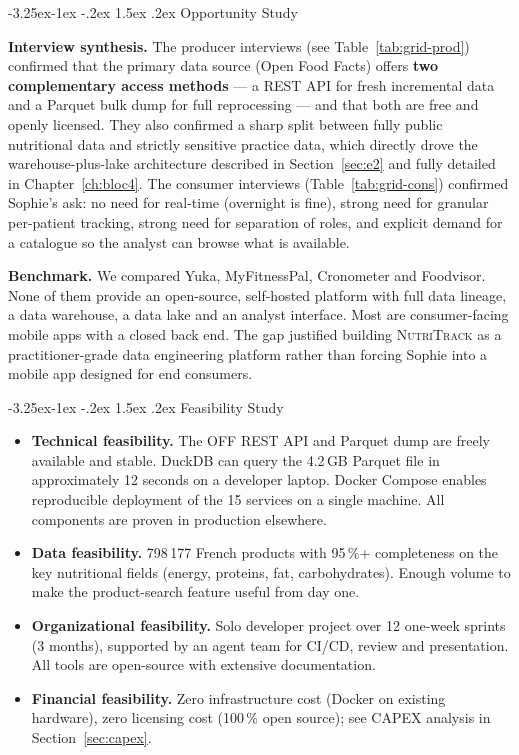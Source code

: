 \documentclass[a4paper,11pt,oneside,openany]{report}
\makeatletter
\renewcommand\subsubsection{\@startsection{subsubsection}{3}{\z@}%
  {-3.25ex\@plus -1ex \@minus -.2ex}%
  {1.5ex \@plus .2ex}%
  {\normalfont\normalsize\bfseries\color{ntblue}}}
\newcommand{\nutritrack}{\textsc{NutriTrack}}
\newcommand{\off}{Open Food Facts}
\makeatother
\begin{document}
\subsubsection{Opportunity Study}

\textbf{Interview synthesis.} The producer interviews (see
Table~\ref{tab:grid-prod}) confirmed that the primary data source
(\off{}) offers \textbf{two complementary access methods} --- a REST
API for fresh incremental data and a Parquet bulk dump for full
reprocessing --- and that both are free and openly licensed. They
also confirmed a sharp split between fully public nutritional data
and strictly sensitive practice data, which directly drove the
warehouse-plus-lake architecture described in
Section~\ref{sec:e2} and fully detailed in Chapter~\ref{ch:bloc4}. The consumer interviews
(Table~\ref{tab:grid-cons}) confirmed Sophie's ask: no need for
real-time (overnight is fine), strong need for granular per-patient
tracking, strong need for separation of roles, and explicit demand
for a catalogue so the analyst can browse what is available.

\textbf{Benchmark.} We compared Yuka, MyFitnessPal, Cronometer and
Foodvisor. None of them provide an open-source, self-hosted
platform with full data lineage, a data warehouse, a data lake and
an analyst interface. Most are consumer-facing mobile apps with a
closed back end. The gap justified building \nutritrack{} as a
practitioner-grade data engineering platform rather than forcing
Sophie into a mobile app designed for end consumers.

\subsubsection{Feasibility Study}

\begin{itemize}[nosep]
  \item \textbf{Technical feasibility.} The OFF REST API and
        Parquet dump are freely available and stable. DuckDB can
        query the 4.2\,GB Parquet file in approximately 12 seconds
        on a developer laptop. Docker Compose enables reproducible
        deployment of the 15 services on a single machine. All
        components are proven in production elsewhere.
  \item \textbf{Data feasibility.} 798\,177 French products with
        95\,\%+ completeness on the key nutritional fields (energy,
        proteins, fat, carbohydrates). Enough volume to make the
        product-search feature useful from day one.
  \item \textbf{Organizational feasibility.} Solo developer project
        over 12 one-week sprints (3 months), supported by an agent
        team for CI/CD, review and presentation. All tools are
        open-source with extensive documentation.
  \item \textbf{Financial feasibility.} Zero infrastructure cost
        (Docker on existing hardware), zero licensing cost
        (100\,\% open source); see CAPEX analysis in
        Section~\ref{sec:capex}.
\end{itemize}
\end{document}
